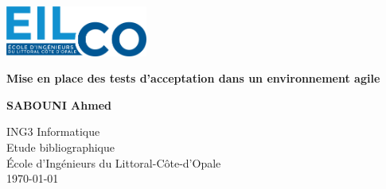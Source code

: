 \begin{titlepage}
    \begin{center}
      \includegraphics[width=0.35\textwidth]{logo.png}
        \vspace*{1.5cm}
        
        \Huge
        \textbf{Mise en place des tests d'acceptation \linebreak dans un environnement agile}
        
        \vspace{0.5cm}
        \LARGE
        
        \vspace{1.5cm}
        
        \textbf{SABOUNI Ahmed}
   		  \vspace{1.5cm}
        
       
        \vfill
        
        ING3 Informatique\\
        
        \vspace{0.8cm}
          \Large
          Etude bibliographique\\
          École d'Ingénieurs du Littoral-Côte-d'Opale\\
      \today
        
    \end{center}
\end{titlepage}